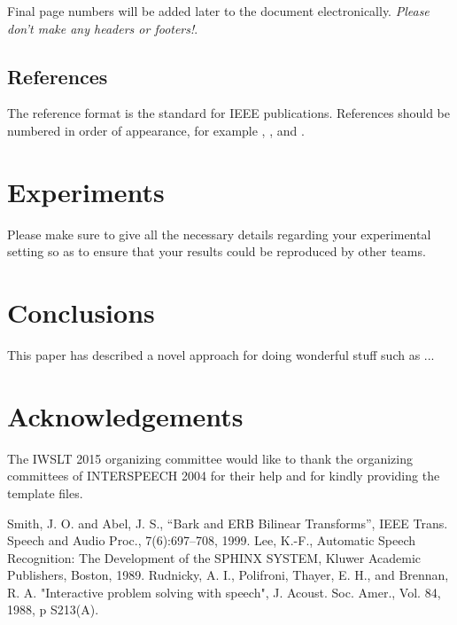 \documentclass[a4paper]{article}
\begin{document}
Final page numbers will be added later to the document
electronically. 
{\em Please don't make any headers or footers!}.

\subsection{References}

The reference format is the standard for IEEE publications.
References should be numbered in order of appearance, 
for example \cite{ES1}, \cite{ES2}, and \cite{ES3}. 

\section{Experiments}
Please make sure to give all the necessary details regarding your experimental 
setting so as to ensure that your results could be reproduced by other teams. 

\section{Conclusions}

This paper has described a novel approach for doing wonderful stuff such as ...

\section{Acknowledgements}
The IWSLT 2015 organizing committee would like to thank the
organizing committees of INTERSPEECH 2004 for their
help and for kindly providing the template files.

%

\begin{thebibliography}{10}
 Smith, J. O. and Abel, J. S., 
``Bark and {ERB} Bilinear Transforms'', 
IEEE Trans. Speech and Audio Proc., 7(6):697--708, 1999.  
 Lee, K.-F., Automatic Speech Recognition: 
The Development of the 
SPHINX SYSTEM, Kluwer Academic Publishers, Boston, 1989.
 Rudnicky, A. I., Polifroni, Thayer, E. H.,
 and Brennan, R. A.  
"Interactive problem solving with speech", J. Acoust. Soc. Amer., 
Vol. 84, 1988, p S213(A).
\end{thebibliography}
\end{document}
